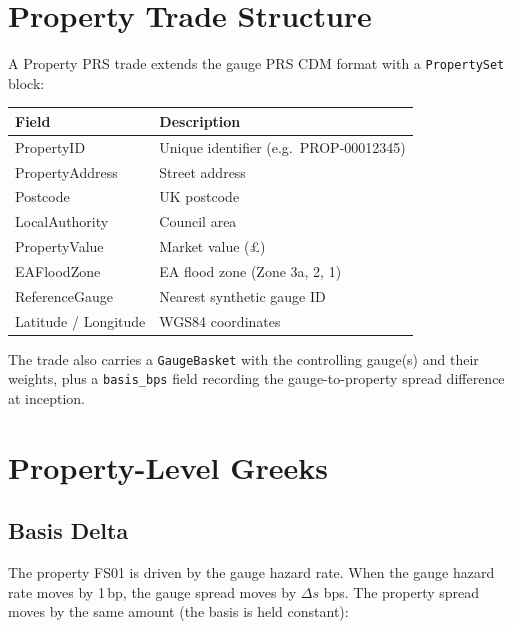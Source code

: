 \documentclass[11pt,a4paper]{article}
\begin{document}
\section{Property Trade Structure}

A Property PRS trade extends the gauge PRS CDM format with a
\texttt{PropertySet} block:

\begin{center}
\begin{tabular}{lp{8cm}}
\toprule
\textbf{Field} & \textbf{Description} \\
\midrule
PropertyID      & Unique identifier (e.g.\ PROP-00012345) \\
PropertyAddress & Street address \\
Postcode        & UK postcode \\
LocalAuthority  & Council area \\
PropertyValue   & Market value (\pounds) \\
EAFloodZone     & EA flood zone (Zone 3a, 2, 1) \\
ReferenceGauge  & Nearest synthetic gauge ID \\
Latitude / Longitude & WGS84 coordinates \\
\bottomrule
\end{tabular}
\end{center}

The trade also carries a \texttt{GaugeBasket} with the controlling
gauge(s) and their weights, plus a \texttt{basis\_bps} field recording
the gauge-to-property spread difference at inception.


\section{Property-Level Greeks}

\subsection{Basis Delta}

The property FS01 is driven by the gauge hazard rate.  When the gauge
hazard rate moves by 1\,bp, the gauge spread moves by $\Delta s$ bps.
The property spread moves by the same amount (the basis is held
constant):
\end{document}
